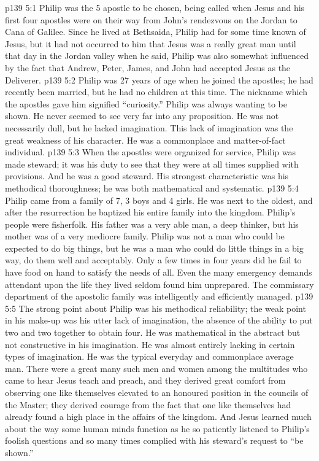 \vs p139 5:1 Philip was the 5 apostle to be chosen, being called when Jesus and his first four apostles were on their way from John’s rendezvous on the Jordan to Cana of Galilee. Since he lived at Bethsaida, Philip had for some time known of Jesus, but it had not occurred to him that Jesus was a really great man until that day in the Jordan valley when he said,  Philip was also somewhat influenced by the fact that Andrew, Peter, James, and John had accepted Jesus as the Deliverer.
\vs p139 5:2 Philip was 27 years of age when he joined the apostles; he had recently been married, but he had no children at this time. The nickname which the apostles gave him signified “curiosity.” Philip was always wanting to be shown. He never seemed to see very far into any proposition. He was not necessarily dull, but he lacked imagination. This lack of imagination was the great weakness of his character. He was a commonplace and matter\hyp{}of\hyp{}fact individual.
\vs p139 5:3 \pc When the apostles were organized for service, Philip was made steward; it was his duty to see that they were at all times supplied with provisions. And he was a good steward. His strongest characteristic was his methodical thoroughness; he was both mathematical and systematic.
\vs p139 5:4 Philip came from a family of 7, 3 boys and 4 girls. He was next to the oldest, and after the resurrection he baptized his entire family into the kingdom. Philip’s people were fisherfolk. His father was a very able man, a deep thinker, but his mother was of a very mediocre family. Philip was not a man who could be expected to do big things, but he was a man who could do little things in a big way, do them well and acceptably. Only a few times in four years did he fail to have food on hand to satisfy the needs of all. Even the many emergency demands attendant upon the life they lived seldom found him unprepared. The commissary department of the apostolic family was intelligently and efficiently managed.
\vs p139 5:5 The strong point about Philip was his methodical reliability; the weak point in his make\hyp{}up was his utter lack of imagination, the absence of the ability to put two and two together to obtain four. He was mathematical in the abstract but not constructive in his imagination. He was almost entirely lacking in certain types of imagination. He was the typical everyday and commonplace average man. There were a great many such men and women among the multitudes who came to hear Jesus teach and preach, and they derived great comfort from observing one like themselves elevated to an honoured position in the councils of the Master; they derived courage from the fact that one like themselves had already found a high place in the affairs of the kingdom. And Jesus learned much about the way some human minds function as he so patiently listened to Philip’s foolish questions and so many times complied with his steward’s request to “be shown.”
